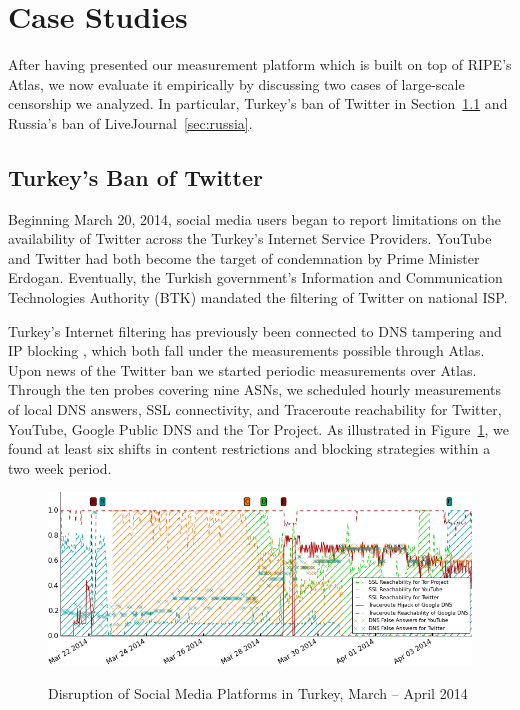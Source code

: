 \section{Case Studies}
\label{sec:case_studies}

After having presented our measurement platform which is built on top of RIPE's
Atlas, we now evaluate it empirically by discussing two cases of large-scale
censorship we analyzed.  In particular, Turkey's ban of Twitter in
Section~\ref{sec:turkey} and Russia's ban of LiveJournal~\ref{sec:russia}.


\subsection{Turkey's Ban of Twitter}
\label{sec:turkey}

Beginning March 20, 2014, social media users began to report limitations on the
availability of Twitter across the Turkey's Internet Service Providers.
YouTube and Twitter had both become the target of condemnation by Prime Minister
Erdogan.  Eventually, the Turkish government's Information
and Communication Technologies Authority (BTK) mandated the filtering of
Twitter on national ISP.

Turkey's Internet filtering has previously been connected to DNS tampering and
IP blocking \cite{akdeniz2010report}, which both fall under the measurements
possible through Atlas.  Upon news of the Twitter ban we started periodic
measurements over Atlas.  Through the ten probes covering nine ASNs, we
scheduled hourly measurements of local DNS answers, SSL connectivity, and
Traceroute reachability for Twitter, YouTube, Google Public DNS and the Tor
Project.  As illustrated in Figure~\ref{image:tr-social_media_filtering}, we
found at least six shifts in content restrictions and blocking strategies
within a two week period.

\begin{figure}
  \includegraphics[width=\textwidth]{resources/tr-20140321-20140407-social_media_filtering.png}
  \label{image:tr-social_media_filtering}
  \caption{Disruption of Social Media Platforms in Turkey, March -- April 2014}
\end{figure}


